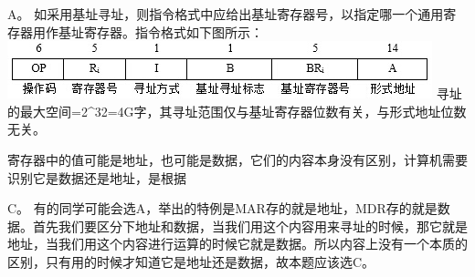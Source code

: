 \par{}
\begin{solution}A。
如采用基址寻址，则指令格式中应给出基址寄存器号，以指定哪一个通用寄存器用作基址寄存器。指令格式如下图所示：
\includegraphics[width=4.84375in,height=0.65625in]{computerassets/7abb2d9c3bbfc12cb302dfa8413e1155.jpeg}
寻址的最大空间=2\^{}32=4G字，其寻址范围仅与基址寄存器位数有关，与形式地址位数无关。
\end{solution}
\question 寄存器中的值可能是地址，也可能是数据，它们的内容本身没有区别，计算机需要识别它是数据还是地址，是根据
\par{}
\begin{solution}C。
有的同学可能会选A，举出的特例是MAR存的就是地址，MDR存的就是数据。首先我们要区分下地址和数据，当我们用这个内容用来寻址的时候，那它就是地址，当我们用这个内容进行运算的时候它就是数据。所以内容上没有一个本质的区别，只有用的时候才知道它是地址还是数据，故本题应该选C。
\end{solution}
